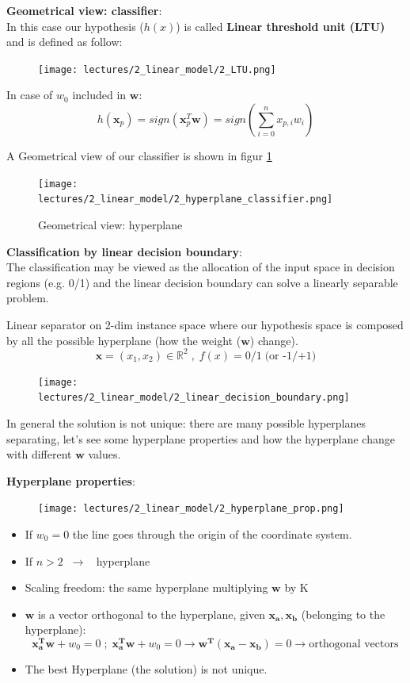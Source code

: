 \documentclass[../main.tex]{subfiles}
\begin{document}
\noindent \textbf{Geometrical view: classifier}:\\
In this case our hypothesis ($h(x)$) is called \textbf{Linear threshold unit (LTU)} and is defined as follow:
\begin{figure}[H]
    \centering
    \texttt{[image: lectures/2\_linear\_model/2\_LTU.png]}
\end{figure}
In case of $w_0$ included in $\mathbf{w}$:
$$ h(\mathbf{x}_p) = sign(\mathbf{x}^T_p\mathbf{w}) = sign(\sum_{i = 0}^{n}x_{p,i}w_i)$$

\noindent A Geometrical view of our classifier is shown in figur \ref{fig:2_hyperplane_classifier}
\begin{figure}[ht]
    \centering
    \texttt{[image: lectures/2\_linear\_model/2\_hyperplane\_classifier.png]}
    \caption{Geometrical view: hyperplane}
    \label{fig:2_hyperplane_classifier}
\end{figure}

\noindent \textbf{Classification by linear decision boundary}:\\
The classification may be viewed as the allocation of the input space in decision regions (e.g. 0/1) and the linear decision boundary can solve a linearly separable problem.

\begin{example}
    Linear separator on 2-dim instance space where our hypothesis space is composed by all the possible hyperplane (how the weight ($\mathbf{w}$) change).
$$\mathbf{x} = (x_1, x_2) \in \mathbb{R}^2 \;,\; f(x) = 0/1 \; \text{(or  -1/+1)}$$
\begin{figure}[H]
    \centering
    \texttt{[image: lectures/2\_linear\_model/2\_linear\_decision\_boundary.png]}
\end{figure}
\end{example}
In general the solution is not unique: there are many possible hyperplanes separating, let's see some hyperplane properties and how the hyperplane change with different $\mathbf{w}$ values.

\textbf{Hyperplane properties}:
\begin{figure}[H]
    \centering
    \texttt{[image: lectures/2\_linear\_model/2\_hyperplane\_prop.png]}
\end{figure}
\begin{itemize}
    \item If $w_0=0$ the line goes through the origin of the coordinate system.
    \item If $n > 2 \;\; \rightarrow \;\;$ hyperplane 
    \item Scaling freedom: the same hyperplane multiplying $\mathbf{w}$ by K
    \item $\mathbf{w}$ is a vector orthogonal to the hyperplane, given $\mathbf{x_a}, \mathbf{x_b}$ (belonging to the hyperplane): $$\mathbf{x_a^Tw}+w_0=0 \;;\; \mathbf{x_a^Tw}+w_0=0 \rightarrow \mathbf{w^T}(\mathbf{x_a- x_b})=0 \rightarrow \text{orthogonal vectors}$$
    \item The best Hyperplane (the solution) is not unique.
\end{itemize}
\end{document}
